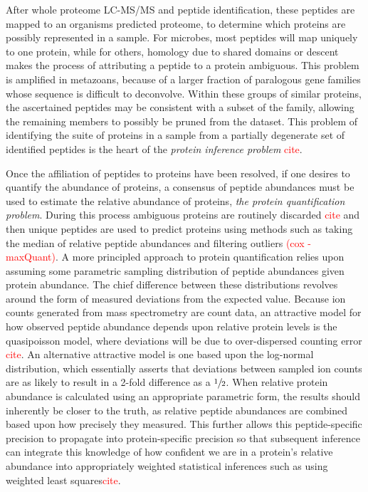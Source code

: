 \documentclass[12pt]{article}
\begin{document}
After whole proteome LC-MS/MS and peptide identification, these peptides are mapped to an organisms predicted proteome, to determine which proteins are possibly represented in a sample. For microbes, most peptides will map uniquely to one protein, while for others, homology due to shared domains or descent makes the process of attributing a peptide to a protein ambiguous. This problem is amplified in metazoans, because of a larger fraction of paralogous gene families whose sequence is difficult to deconvolve. Within these groups of similar proteins, the ascertained peptides may be consistent with a subset of the family, allowing the remaining members to possibly be pruned from the dataset. This problem of identifying the suite of proteins in a sample from a partially degenerate set of identified peptides is the heart of the \textit{protein inference problem} \textcolor{red}{cite}.

Once the affiliation of peptides to proteins have been resolved, if one desires to quantify the abundance of proteins, a consensus of peptide abundances must be used to estimate the relative abundance of proteins, \textit{the protein quantification problem}. During this process ambiguous proteins are routinely discarded \textcolor{red}{cite} and then unique peptides are used to predict proteins using methods such as taking the median of relative peptide abundances and filtering outliers \textcolor{red}{(cox - maxQuant)}. A more principled approach to protein quantification relies upon assuming some parametric sampling distribution of peptide abundances given protein abundance. The chief difference between these distributions revolves around the form of measured deviations from the expected value. Because ion counts generated from mass spectrometry are count data, an attractive model for how observed peptide abundance depends upon relative protein levels is the quasipoisson model, where deviations will be due to over-dispersed counting error \textcolor{red}{cite}. An alternative attractive model is one based upon the log-normal distribution, which essentially asserts that deviations between sampled ion counts are as likely to result in a 2-fold difference as a $\sfrac{1}{2}$. When relative protein abundance is calculated using an appropriate parametric form, the results should inherently be closer to the truth, as relative peptide abundances are combined based upon how precisely they measured. This further allows this peptide-specific precision to propagate into protein-specific precision so that subsequent inference can integrate this knowledge of how confident we are in a protein's relative abundance into appropriately weighted statistical inferences such as using weighted least squares\textcolor{red}{cite}.
\end{document}
